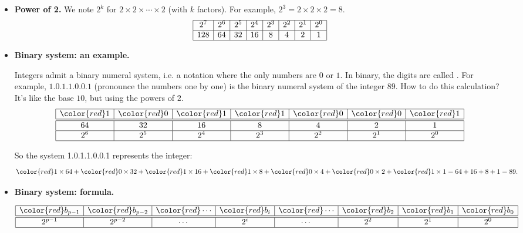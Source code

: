 \documentclass[11pt,class=report,crop=false]{standalone}
\begin{document}
\begin{cours}[Binary]
\sauteligne
\begin{itemize}
  \item \textbf{Power of 2.}
    We note $2^k$ for $2 \times 2 \times \cdots \times 2$ (with $k$ factors). For example, $2^3 = 2 \times 2 \times 2 = 8$. 
$$
\begin{array}{|c|c|c|c|c|c|c|c|}
  \hline
  2^7  & 2^6 & 2^5 & 2^4 & 2^3 & 2^2 & 2^1 & 2^0 \\
  \hline
  128 & 64 & 32 & 16 & 8 & 4 & 2 & 1 \\ 
  \hline
\end{array}
$$

  \item \textbf{Binary system: an example.}
  
    Integers admit a binary numeral system, i.e. a notation where the only numbers are $0$ or $1$. In binary, the digits are called .
     For example, $1.0.1.1.0.0.1$ (pronounce the numbers one by one) is the binary numeral system of the integer $89$. How to do this calculation? It's like the base $10$, but using the powers of $2$.
$$
\begin{array}{|c|c|c|c|c|c|c|}
  \hline
  {\color{red}1} & {\color{red}0} & {\color{red}1} & {\color{red}1} & {\color{red}0} & {\color{red}0} & {\color{red}1} \\ 
  \hline\hline
  64 & 32 & 16  & 8 & 4 & 2 & 1 \\\hline
  2^6 & 2^5 & 2^4 & 2^3 & 2^2 & 2^1 & 2^0 \\
  \hline
\end{array}
$$


    So the system {\color{red}1}.{\color{red}0}.{\color{red}1}.{\color{red}1}.{\color{red}0}.{\color{red}0}.{\color{red}1} represents the integer: 
    $${\color{red}1} \times 64  + {\color{red}0} \times 32 + {\color{red}1} \times 16  + {\color{red}1} \times 8 + {\color{red}0} \times 4 + {\color{red}0} \times 2 + {\color{red}1} \times 1 = 64 + 16 + 8 + 1 = 89.$$
    
    
   \item \textbf{Binary system: formula.} 
 
 
  $$
\begin{array}{|c|c|c|c|c|c|c|c|}
  \hline
  {\color{red}b_{p-1}} & {\color{red}b_{p-2}}& {\color{red}\cdots} & {\color{red}b_i}& {\color{red}\cdots} & {\color{red}b_2} & {\color{red}b_1} & {\color{red}b_0} \\ 
  \hline\hline
  2^{p-1} & 2^{p-2} & \cdots & 2^i &\cdots & 2^2 & 2^1 & 2^0 \\
  \hline
\end{array}
$$   
  

\end{itemize}
\end{cours}
\end{document}
